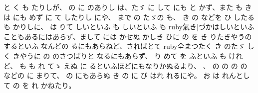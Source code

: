 
と
く
も
たりしが、
の
に
のありし
は、たゞ
に
して
にも
と
かず、また
も
き
は
にも
めず
に
て
したりし
にや、
まで
の
たゞの
も、
き
の
などを
ひ
したる
も
かりしに、
は
りて
しいといふ
も
しいといふ
も
ruby{氣{}}{き|づか}はしいといふこともあるにはあらず、まして
には
かせぬ
かしき
ひに
の
を
き
りたきやうの
するといふ
なんどの
るにもあらねど、さればとて
ruby{全}{まつた}く
き
のたゞ
しく
きやうに
の
のさつぱりと
なるにもあらず、
り
めて
を
ふといふ
も
けれど、
も
も
れ
てゝ
えぬ
に
るといふほどにもなりかぬるより、
、
の
の
の
の
などの
に
まりて、
の
にもあらぬ
き
の
に
び
はれ
れるにや。
お
は
れんとして
の
を
れ
かねたり。

